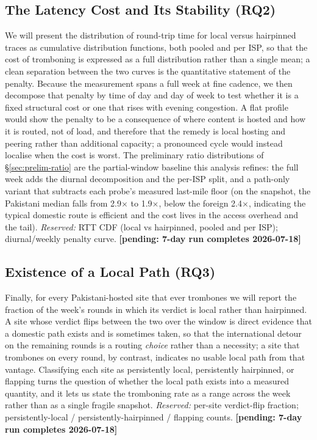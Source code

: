 \documentclass[sigconf,anonymous,10pt]{acmart}
\newcommand{\pending}{\textbf{[pending: 7-day run completes 2026-07-18]}}
\begin{document}
\subsection{The Latency Cost and Its Stability (RQ2)}
\label{sec:rq2}
We will present the distribution of round-trip time for local versus hairpinned traces as cumulative
distribution functions, both pooled and per ISP, so that the cost of tromboning is expressed as a
full distribution rather than a single mean; a clean separation between the two curves is the
quantitative statement of the penalty. Because the measurement spans a full week at fine cadence, we
then decompose that penalty by time of day and day of week to test whether it is a fixed structural
cost or one that rises with evening congestion. A flat profile would show the penalty to be a
consequence of where content is hosted and how it is routed, not of load, and therefore that the
remedy is local hosting and peering rather than additional capacity; a pronounced cycle would
instead localise when the cost is worst. The preliminary ratio distributions of
\S\ref{sec:prelim-ratio} are the partial-window baseline this analysis refines: the full week adds
the diurnal decomposition and the per-ISP split, and a path-only variant that subtracts each
probe's measured last-mile floor (on the snapshot, the Pakistani median falls from 2.9$\times$ to
1.9$\times$, below the foreign 2.4$\times$, indicating the typical domestic route is efficient and
the cost lives in the access overhead and the tail).
\emph{Reserved:} RTT CDF (local vs hairpinned, pooled and per ISP); diurnal/weekly penalty curve. \pending

\subsection{Existence of a Local Path (RQ3)}
\label{sec:rq3}
Finally, for every Pakistani-hosted site that ever trombones we will report the fraction of the
week's rounds in which its verdict is local rather than hairpinned. A site whose verdict flips
between the two over the window is direct evidence that a domestic path exists and is sometimes
taken, so that the international detour on the remaining rounds is a routing \emph{choice} rather
than a necessity; a site that trombones on every round, by contrast, indicates no usable local path
from that vantage. Classifying each site as persistently local, persistently hairpinned, or flapping
turns the question of whether the local path exists into a measured quantity, and it lets us state
the tromboning rate as a range across the week rather than as a single fragile snapshot.
\emph{Reserved:} per-site verdict-flip fraction; persistently-local / persistently-hairpinned / flapping counts. \pending
\end{document}
